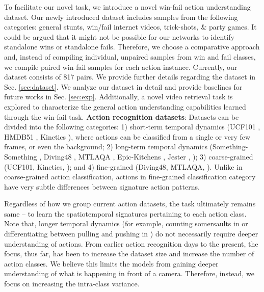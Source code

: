 \documentclass[final]{cvpr}
\begin{document}
To facilitate our novel task, we introduce a novel win-fail action understanding dataset. Our newly introduced dataset includes samples from the following categories: general stunts, win/fail internet videos, trick-shots, \& party games. It could be argued that it might not be possible for our networks to identify standalone wins or standalone fails. Therefore, we choose a comparative approach and, instead of compiling individual, unpaired samples from win and fail classes, we compile paired win-fail samples for each action instance. Currently, our dataset consists of 817 pairs. We provide further details regarding the dataset in Sec. \ref{sec:dataset}. We analyze our dataset in detail and provide baselines for future works in Sec. \ref{sec:exp}. Additionally, a novel video retrieval task is explored to characterize the general action understanding capabilities learned through the win-fail task.
\noindent\textbf{Action recognition datasets}: Datasets can be divided into the following categories: 1) short-term temporal dynamics (UCF101 \cite{ucf101}, HMDB51 \cite{hmdb51}, Kinetics \cite{kinetics}), where actions can be classified from a single or very few frames, or even the background; 2) long-term temporal dynamics (Something-Something \cite{sthsth}, Diving48 \cite{diving48}, MTLAQA \cite{mtlaqa}, Epic-Kitchens \cite{epickitchens}, Jester \cite{jester}, \etc); 3) coarse-grained (UCF101, Kinetics, \etc); and 4) fine-grained (Diving48, MTLAQA, \etc). Unlike in coarse-grained action classification, actions in fine-grained classification category have very subtle differences between signature action patterns. 

Regardless of how we group current action datasets, the task ultimately remains same -- to learn the spatiotemporal signatures pertaining to each action class. Note that, longer temporal dynamics (for example, counting somersaults in \cite{diving48, mtlaqa} or differentiating between pulling and pushing in \cite{sthsth}) do not necessarily require deeper understanding of actions. From earlier action recognition days to the present, the focus, thus far, has been to increase the dataset size and increase the number of action classes. We believe this limits the models from gaining deeper understanding of what is happening in front of a camera. Therefore, instead, we focus on increasing the intra-class variance.
\end{document}
